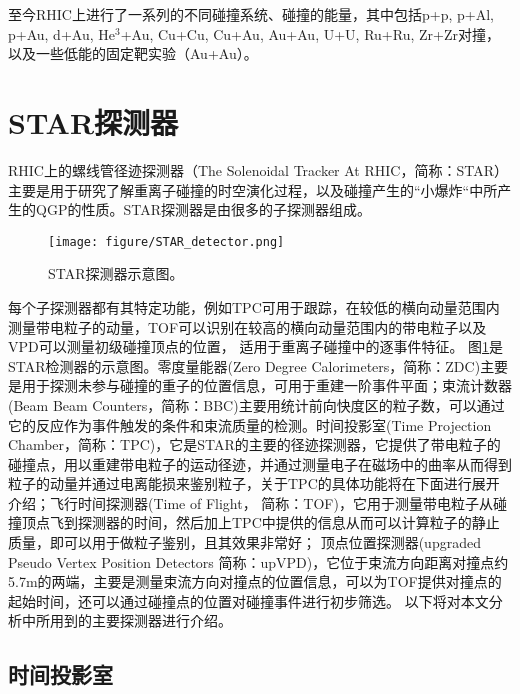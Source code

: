 至今RHIC上进行了一系列的不同碰撞系统、碰撞的能量，其中包括p+p, p+Al, p+Au, d+Au, $\mathrm{He^3}$+Au, Cu+Cu, Cu+Au, Au+Au, U+U, Ru+Ru, Zr+Zr对撞，以及一些低能的固定靶实验（Au+Au）。

\bigskip

\section{STAR探测器}

RHIC上的螺线管径迹探测器（The Solenoidal Tracker At RHIC，简称：STAR）主要是用于研究了解重离子碰撞的时空演化过程，以及碰撞产生的“小爆炸“中所产生的QGP的性质。STAR探测器是由很多的子探测器组成\cite{ackermann2003star}。%
\begin{figure}[htbp]
\centering
\texttt{[image: figure/STAR\_detector.png]}
\caption{STAR探测器示意图。}
\label{fig:star_overview}
\end{figure}
 每个子探测器都有其特定功能，例如TPC可用于跟踪，在较低的横向动量范围内测量带电粒子的动量，TOF可以识别在较高的横向动量范围内的带电粒子以及VPD可以测量初级碰撞顶点的位置， 适用于重离子碰撞中的逐事件特征。
 图\ref {fig:star_overview}是STAR检测器的示意图。零度量能器(Zero Degree Calorimeters，简称：ZDC)\cite{adler2001rhic}主要是用于探测未参与碰撞的重子的位置信息，可用于重建一阶事件平面；束流计数器(Beam Beam Counters，简称：BBC)\cite{whitten2008beam}主要用统计前向快度区的粒子数，可以通过它的反应作为事件触发的条件和束流质量的检测。时间投影室(Time Projection Chamber，简称：TPC)\cite{anderson2003star}，它是STAR的主要的径迹探测器，它提供了带电粒子的碰撞点，用以重建带电粒子的运动径迹，并通过测量电子在磁场中的曲率从而得到粒子的动量并通过电离能损来鉴别粒子，关于TPC的具体功能将在下面进行展开介绍；飞行时间探测器(Time of Flight， 简称：TOF)\cite{bonner2003single,llope2004tofp,llope2005large}，它用于测量带电粒子从碰撞顶点飞到探测器的时间，然后加上TPC中提供的信息从而可以计算粒子的静止质量，即可以用于做粒子鉴别，且其效果非常好；
顶点位置探测器(upgraded Pseudo Vertex Position Detectors 简称：upVPD)\cite{llope2014star}，它位于束流方向距离对撞点约5.7m的两端，主要是测量束流方向对撞点的位置信息，可以为TOF提供对撞点的起始时间，还可以通过碰撞点的位置对碰撞事件进行初步筛选。
以下将对本文分析中所用到的主要探测器进行介绍。




\subsection{时间投影室}

